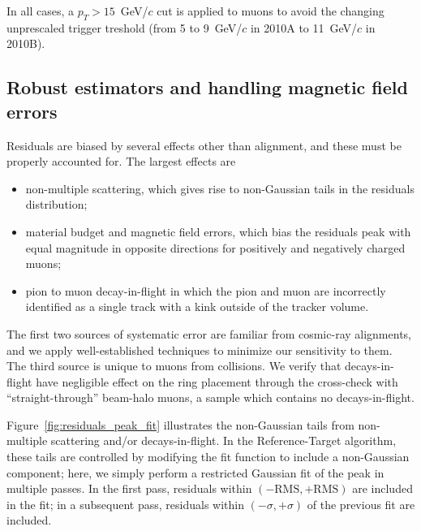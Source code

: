 \documentclass[12pt]{article}
\begin{document}
In all cases, a $p_T > 15$~GeV/$c$ cut is applied to muons to avoid
the changing unprescaled trigger treshold (from 5 to 9~GeV/$c$ in
2010A to 11~GeV/$c$ in 2010B).

\subsection{Robust estimators and handling magnetic field errors}

Residuals are biased by several effects other than alignment, and
these must be properly accounted for.  The largest effects are
\begin{itemize}
\item non-multiple scattering, which gives rise to non-Gaussian tails
  in the residuals distribution;
\item material budget and magnetic field errors, which bias the
  residuals peak with equal magnitude in opposite directions for
  positively and negatively charged muons;
\item pion to muon decay-in-flight in which the pion and muon are
  incorrectly identified as a single track with a kink outside of the
  tracker volume.
\end{itemize}
The first two sources of systematic error are familiar from cosmic-ray
alignments, and we apply well-established techniques to minimize our
sensitivity to them.  The third source is unique to muons from
collisions.  We verify that decays-in-flight have negligible effect on
the ring placement through the cross-check with ``straight-through''
beam-halo muons, a sample which contains no decays-in-flight.

Figure~\ref{fig:residuals_peak_fit} illustrates the non-Gaussian tails
from non-multiple scattering and/or decays-in-flight.  In the
Reference-Target algorithm, these tails are controlled by modifying
the fit function to include a non-Gaussian component; here, we simply
perform a restricted Gaussian fit of the peak in multiple passes.  In
the first pass, residuals within $(-\mbox{RMS}, +\mbox{RMS})$ are
included in the fit; in a subsequent pass, residuals within $(-\sigma,
+\sigma)$ of the previous fit are included.
\end{document}
